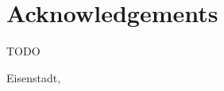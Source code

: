\thispagestyle{empty}
\chapter{Acknowledgements}

TODO




\vspace{2cm} 


\begin{flushleft}
    \yourNameInclTitle 
\end{flushleft}
Eisenstadt, \thesisDate 

\clearpage
